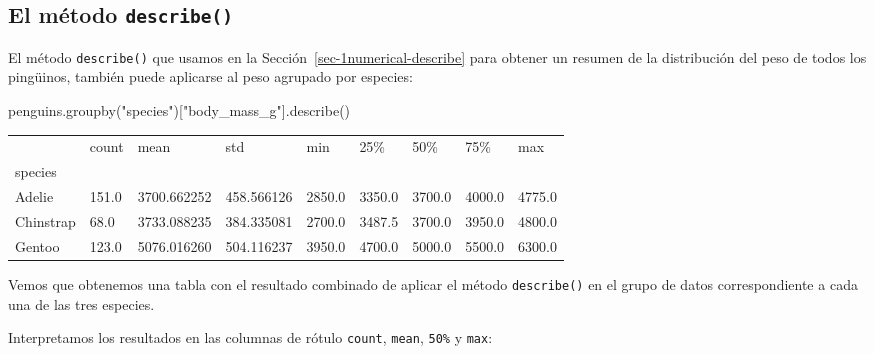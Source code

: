 \documentclass[
  a4paper,
  noprof,
  12pt,
  notoc,
  nosols,
  nobib]{mnye}
\newenvironment{Shaded}{\begin{snugshade}}{\end{snugshade}}
\newcommand{\NormalTok}[1]{\textcolor[rgb]{0.00,0.23,0.31}{#1}}
\newcommand{\StringTok}[1]{\textcolor[rgb]{0.13,0.47,0.30}{#1}}
\theoremstyle{definition}
\theoremstyle{remark}
\begin{document}
\subsection{\texorpdfstring{El método
\texttt{describe()}}{El método describe()}}\label{el-muxe9todo-describe}

El método \texttt{describe()} que usamos en la
Sección~\ref{sec-1numerical-describe} para obtener un resumen de la
distribución del peso de todos los pingüinos, también puede aplicarse al
peso agrupado por especies:

\begin{Shaded}
\begin{Highlighting}[]
\NormalTok{penguins.groupby(}\StringTok{"species"}\NormalTok{)[}\StringTok{"body\_mass\_g"}\NormalTok{].describe()}
\end{Highlighting}
\end{Shaded}

\begin{longtable}[]{@{}lllllllll@{}}
\toprule\noalign{}
& count & mean & std & min & 25\% & 50\% & 75\% & max \\
species & & & & & & & & \\
\midrule\noalign{}
\endhead
\bottomrule\noalign{}
\endlastfoot
Adelie & 151.0 & 3700.662252 & 458.566126 & 2850.0 & 3350.0 & 3700.0 &
4000.0 & 4775.0 \\
Chinstrap & 68.0 & 3733.088235 & 384.335081 & 2700.0 & 3487.5 & 3700.0 &
3950.0 & 4800.0 \\
Gentoo & 123.0 & 5076.016260 & 504.116237 & 3950.0 & 4700.0 & 5000.0 &
5500.0 & 6300.0 \\
\end{longtable}

Vemos que obtenemos una tabla con el resultado combinado de aplicar el
método \texttt{describe()} en el grupo de datos correspondiente a cada
una de las tres especies.

Interpretamos los resultados en las columnas de rótulo \texttt{count},
\texttt{mean}, \texttt{50\%} y \texttt{max}:
\end{document}
